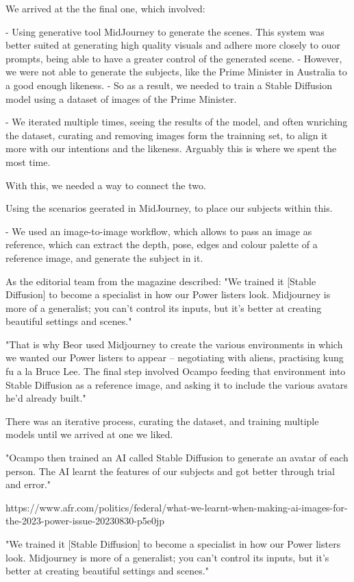 We arrived at the the final one, which involved: 

- Using generative tool MidJourney to generate the scenes. This system was better suited at generating high quality visuals and adhere more closely to ouor prompts, being able to have a greater control of the generated scene. 
- However, we were not able to generate the subjects, like the Prime Minister in Australia to a good enough likeness. 
- So as a result, we needed to train a Stable Diffusion model using a dataset of images of the Prime Minister. 

- We iterated multiple times, seeing the results of the model, and often wnriching the dataset, curating and removing images form the trainning set, to align it more with our intentions and the likeness. Arguably this is where we spent the most time. 

With this, we needed a way to connect the two. 

Using the scenarios geerated in MidJourney, to place our subjects within this. 

- We used an image-to-image workflow, which allows to pass an image as reference, which can extract the depth, pose, edges and colour palette of a reference image, and generate the subject in it. 

As the editorial team from the magazine described: "We trained it [Stable Diffusion] to become a specialist in how our Power listers look. Midjourney is more of a generalist; you can’t control its inputs, but it’s better at creating beautiful settings and scenes."

"That is why Beor used Midjourney to create the various environments in which we wanted our Power listers to appear – negotiating with aliens, practising kung fu a la Bruce Lee. The final step involved Ocampo feeding that environment into Stable Diffusion as a reference image, and asking it to include the various avatars he’d already built."


There was an iterative process, curating the dataset, and training multiple models until we arrived at one we liked. 


"Ocampo then trained an AI called Stable Diffusion to generate an avatar of each person. The AI learnt the features of our subjects and got better through trial and error."

https://www.afr.com/politics/federal/what-we-learnt-when-making-ai-images-for-the-2023-power-issue-20230830-p5e0jp

"We trained it [Stable Diffusion] to become a specialist in how our Power listers look. Midjourney is more of a generalist; you can’t control its inputs, but it’s better at creating beautiful settings and scenes."


